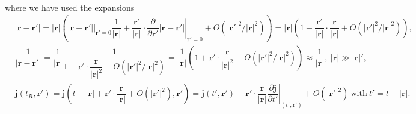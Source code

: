 \documentclass[10pt, a4paper]{article}
\begin{document}
{\begin{align*}
\end{align*}
where we have used the expansions 
\begin{align*}
    &|\mathbf{r}-\mathbf{r}'| = |\mathbf{r}|\left(\left.|\mathbf{r}-\mathbf{r}'|\right|_{\mathbf{r}' = 0}\dfrac{1}{|\mathbf{r}|} + \dfrac{\mathbf{r}'}{|\mathbf{r}|}\cdot \left.\dfrac{\partial}{\partial \mathbf{r}'} |\mathbf{r}-\mathbf{r}'|\right|_{\mathbf{r}' = 0} + O(|\mathbf{r}'|^2/|\mathbf{r}|^2)\right) = |\mathbf{r}|\left(1 - \dfrac{\mathbf{r}'}{|\mathbf{r}|}\cdot\dfrac{\mathbf{r}}{|\mathbf{r}|} + O(|\mathbf{r}'|^2/|\mathbf{r}|^2)\right),\\
    &\dfrac{1}{|\mathbf{r}-\mathbf{r}'|} =  \dfrac{1}{\mathbf{|\mathbf{r}|}} \dfrac{1}{1 - \mathbf{r}'\cdot\dfrac{\mathbf{r}}{|\mathbf{r}|^2} + O(|\mathbf{r}'|^2/|\mathbf{r}|^2)} = \dfrac{1}{\mathbf{|\mathbf{r}|}} \left(1 + \mathbf{r}'\cdot\dfrac{\mathbf{r}}{|\mathbf{r}|^2} + O(|\mathbf{r}'|^2/|\mathbf{r}|^2)\right)  \approx  \dfrac{1}{|\mathbf{r}|},\ |\mathbf{r}| \gg |\mathbf{r}|', \\
    &\mathbf{j}(t_R, \mathbf{r}') = \mathbf{j}\left(t-|\mathbf{r}| + \mathbf{r}'\cdot\dfrac{\mathbf{r}}{|\mathbf{r}|} + O(|\mathbf{r'}|^2), \mathbf{r}'\right)= \mathbf{j}(t', \mathbf{r}') + \mathbf{r}' \cdot \dfrac{\mathbf{r}}{|\mathbf{r}|} \left.\dfrac{\partial \mathbf{j}}{\partial t'} \right|_{(t', \mathbf{r'})} + O(|\mathbf{r'}|^2)\ \text{with}\ t' = t-|\mathbf{r}|.
\end{align*}

}
\end{document}
